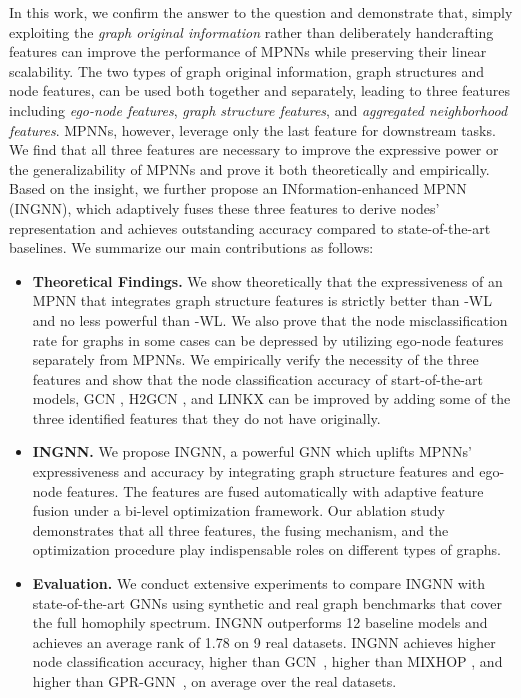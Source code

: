 \documentclass{article}
\theoremstyle{plain}
\newcommand{\pjn}{{INGNN}}
\begin{document}
In this work, we confirm the answer to the question and demonstrate that, simply exploiting the \textit{graph original information} rather than deliberately handcrafting features can improve the performance of MPNNs while preserving their linear scalability. The two types of graph original information, graph structures and node features, can be used both together and separately, leading to three features including \textit{ego-node features}, \textit{graph structure features}, and \textit{aggregated neighborhood features}. 
MPNNs, however, leverage only the last feature for downstream tasks. 
We find that all three features are necessary to improve the expressive power or the generalizability of MPNNs and prove it both theoretically and empirically. 
Based on the insight, we further propose an INformation-enhanced MPNN (\pjn{}), which adaptively fuses these three features to derive nodes' representation and achieves outstanding accuracy compared to state-of-the-art baselines.  
We summarize our main contributions as follows:





\begin{itemize}
    \item \textbf{Theoretical Findings.} 
    We show theoretically that the expressiveness of an MPNN that integrates graph structure features is strictly better than -WL and no less powerful than -WL.
    We also prove that the node misclassification rate for graphs in some cases can be depressed by utilizing ego-node features separately from MPNNs.
    We empirically verify the necessity of the three features and show that the node classification accuracy of start-of-the-art models, GCN \cite{kipf2016semi}, H2GCN \cite{zhu2020beyond}, and LINKX \cite{lim2021large} can be improved by adding some of the three identified features that they do not have originally.

    \item \textbf{\pjn{}.} We propose \pjn{}, a powerful GNN which uplifts MPNNs' expressiveness and accuracy by integrating graph structure features and ego-node features. The features are fused automatically with adaptive feature fusion under a bi-level optimization framework.
    Our ablation study demonstrates that all three features, the fusing mechanism, and the optimization procedure play indispensable roles on different types of graphs.
    
    \item \textbf{Evaluation.} 
    We conduct extensive experiments to compare \pjn{} with state-of-the-art GNNs using synthetic and real graph benchmarks that cover the full homophily spectrum. \pjn{} outperforms 12 baseline models and achieves an average rank of 1.78 on 9 real datasets. \pjn{} achieves higher node classification accuracy,  higher than GCN~\cite{kipf2016semi},  higher than MIXHOP \cite{abu2019mixhop}, and  higher than GPR-GNN~\cite{chien2020adaptive}, on average over the real datasets.
    
\end{itemize}
\end{document}
